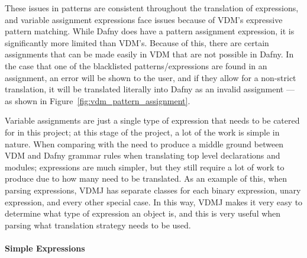 \documentclass{entcs}
\begin{document}
These issues in patterns are consistent throughout the translation of expressions, and variable assignment expressions face issues because of VDM's expressive pattern matching. While Dafny does have a pattern assignment expression, it is significantly more limited than VDM's. Because of this, there are certain assignments that can be made easily in VDM that are not possible in Dafny. In the case that one of the blacklisted patterns/expressions are found in an assignment, an error will be shown to the user, and if they allow for a non-strict translation, it will be translated literally into Dafny as an invalid assignment --- as shown in Figure~\ref{fig:vdm_pattern_assignment}. 

Variable assignments are just a single type of expression that needs to be catered for in this project; at this stage of the project, a lot of the work is simple in nature. When comparing with the need to produce a middle ground between VDM and Dafny grammar rules when translating top level declarations and modules; expressions are much simpler, but they still require a lot of work to produce due to how many need to be translated. As an example of this, when parsing expressions, VDMJ has separate classes for each binary expression, unary expression, and every other special case. In this way, VDMJ makes it very easy to determine what type of expression an object is, and this is very useful when parsing what translation strategy needs to be used.

\paragraph{Simple Expressions}
\end{document}
